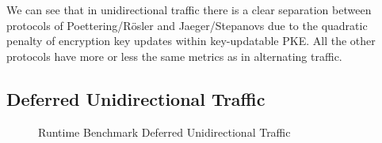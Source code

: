 \documentclass[11pt,a4paper,twoside,openright,bibliography=totoc]{scrbook}
\begin{document}
We can see that in unidirectional traffic there is a clear separation
between protocols of Poettering/Rösler and Jaeger/Stepanovs due
to the quadratic penalty of encryption key updates within
key-updatable PKE. All the other protocols have more or less
the same metrics as in alternating traffic.

\clearpage

\subsection{Deferred Unidirectional Traffic}
\label{sec:deferr-unid-traff-1}

\begin{figure}[H]
  \centering
   
  \caption{Runtime Benchmark Deferred Unidirectional Traffic}
  \label{fig:time-def-uni}
\end{figure}
\end{document}
